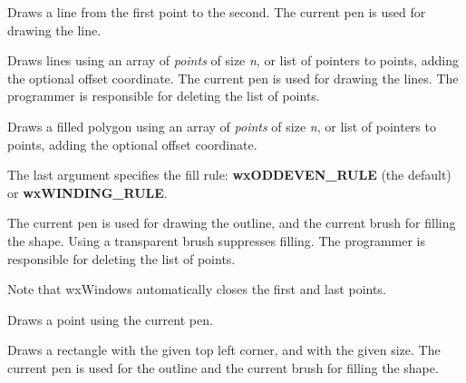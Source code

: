 Draws a line from the first point to the second. The current pen is used
for drawing the line.




Draws lines using an array of {\it points} of size {\it n}, or list of
pointers to points, adding the optional offset coordinate. The current
pen is used for drawing the lines.  The programmer is responsible for
deleting the list of points.




Draws a filled polygon using an array of {\it points} of size {\it n},
or list of pointers to points, adding the optional offset coordinate.

The last argument specifies the fill rule: {\bf wxODDEVEN\_RULE} (the
default) or {\bf wxWINDING\_RULE}.

The current pen is used for drawing the outline, and the current brush
for filling the shape.  Using a transparent brush suppresses filling.
The programmer is responsible for deleting the list of points.

Note that wxWindows automatically closes the first and last points.



Draws a point using the current pen.



Draws a rectangle with the given top left corner, and with the given
size.  The current pen is used for the outline and the current brush
for filling the shape.

